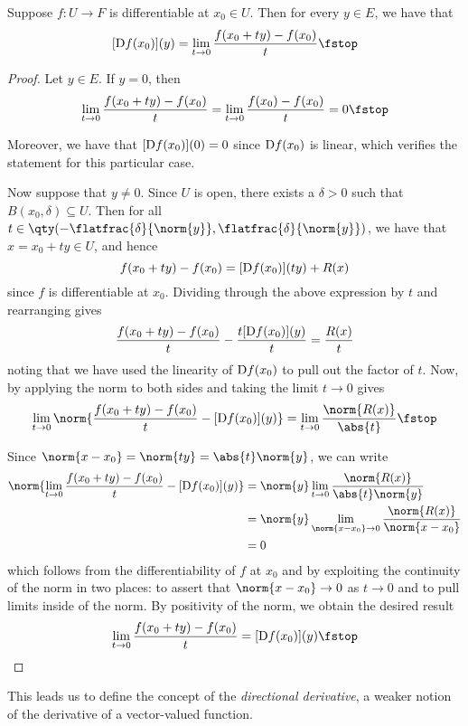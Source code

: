 \begin{proposition}
  \label{thm:direction-deriv}
  Suppose \( f:U\to F \) is differentiable at \( x_0\in U \). Then for every \( y\in E \), we have that
  \[ [\D f(x_0)](y)=\lim_{t\to 0}\frac{f(x_0+ty)-f(x_0)}{t}\fstop \]
\end{proposition}
\begin{proof}
  Let \( y\in E \). If \( y=0 \), then
  \[ \lim_{t\to 0}\frac{f(x_0+ty)-f(x_0)}{t}=\lim_{t\to 0}\frac{f(x_0)-f(x_0)}{t}=0\fstop \]

  Moreover, we have that \( [\text{D} f(x_0)](0)=0 \) since \( \text{D} f(x_0) \) is linear, which verifies the statement for this particular case.

  \vspace{3mm}

  Now suppose that \( y\neq 0 \). Since \( U \) is open, there exists a \( \delta>0 \) such that \( B(x_0,\delta)\subseteq U \). Then for all \( t\in\qty(-\flatfrac{\delta}{\norm{y}},\flatfrac{\delta}{\norm{y}}) \), we have that \( x=x_0+ty\in U \), and hence
  \[ f(x_0+ty)-f(x_0)=[\text{D} f(x_0)](ty)+R(x) \]
  since \( f \) is differentiable at \( x_0 \). Dividing through the above expression by \( t \) and rearranging gives
  \[ \frac{f(x_0+ty)-f(x_0)}{t}- \frac{t[\text{D} f(x_0)](y)}{t}=\frac{R(x)}{t} \]
  noting that we have used the linearity of \( \text{D} f(x_0) \) to pull out the factor of \( t \). Now, by applying the norm to both sides and taking the limit \( t\to 0 \) gives
  \[ \lim_{t\to 0}\norm{\frac{f(x_0+ty)-f(x_0)}{t}- [\D f(x_0)](y)}=\lim_{t\to 0}\frac{\norm{R(x)}}{\abs{t}}\fstop \]

  Since \( \norm{x-x_0}=\norm{ty}=\abs{t}\norm{y} \), we can write
  \begin{align*}
    \norm{\lim_{t\to 0}\frac{f(x_0+ty)-f(x_0)}{t}- [\D f(x_0)](y)}&=\norm{y}\lim_{t\to 0}\frac{\norm{R(x)}}{\abs{t}\norm{y}}\\
    &= \norm{y}\lim_{\norm{x-x_0}\to 0}\frac{\norm{R(x)}}{\norm{x-x_0}}\\
    &= 0
  \end{align*}
  which follows from the differentiability of \( f \) at \( x_0 \) and by exploiting the continuity of the norm in two places: to assert that \( \norm{x-x_0}\to 0 \) as \( t\to 0 \) and to pull limits inside of the norm. By positivity of the norm, we obtain the desired result
  \[ \lim_{t\to 0}\frac{f(x_0+ty)-f(x_0)}{t}=[\D f(x_0)](y)\fstop \]
\end{proof}

This leads us to define the concept of the \emph{directional derivative}, a weaker notion of the derivative of a vector-valued function.

